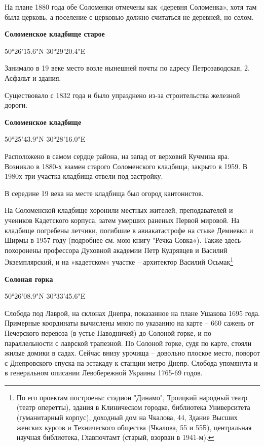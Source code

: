 На плане 1880 года обе Соломенки отмечены как «деревня Соломенка», хотя там была церковь, а поселение с церковью должно считаться не деревней, но селом.\\

\medskip

\textbf{Соломенское кладбище старое}

50°26'15.6"N 30°29'20.4"E

Занимало в 19 веке место возле нынешней почты по адресу Петрозаводская, 2. Асфальт и здания.

Существовало с 1832 года и было упразднено из-за строительства железной дороги.
\\

\medskip

\textbf{Соломенское кладбище}

50°25'43.9"N 30°28'16.0"E

Расположено в самом сердце района, на запад от верховий Кучмина яра. Возникло в 1880-х взамен старого Соломенского кладбища, закрыто в 1959. В 1980х три участка кладбища отвели под застройку.

В середине 19 века на месте кладбища был огород кантонистов.

На Соломенской кладбище хоронили местных жителей, преподавателей и учеников Кадетского корпуса, затем умерших раненых Первой мировой. На кладбище погребены летчики, погибшие в авиакатастрофе на стыке Демиевки и Ширмы в 1957 году (подробнее см. мою книгу "Речка Совка«). Также здесь похоронены профессора Духовной академии Петр Кудрявцев и Василий Экземплярский, и на »кадетском« участке – архитектор Василий Осьмак\footnote{По его проектам построены: стадион "Динамо", Троицкий народный театр (театр оперетты), здания в Клиническом городке, библиотека Университета (гуманитарный корпус), доходный дом на Чкалова, 44, Здание Высших женских курсов и Технического общества (Чкалова, 55 и 55Б), центральная научная библиотека, Главпочтамт (старый, взорван в 1941-м).}\\

\medskip

\textbf{Солоная горка} 

50°26'08.9"N 30°33'45.6"E

Слобода под Лаврой, на склонах Днепра, показанное на плане Ушакова 1695 года. Примерные координаты вычислены мною по указанию на карте – 660 сажень от Печерского перевоза (в устье Наводничей) до Солоной горке, и по параллельности с лаврской трапезной. По Солоной горке, судя по карте, стояли жилые домики в садах. Сейчас внизу урочища – довольно плоское место, поворот с Днепровского спуска на эстакаду к станции метро Днепр. Слобода упомянута и в генеральном описании Левобережной Украины 1765-69 годов.\\

